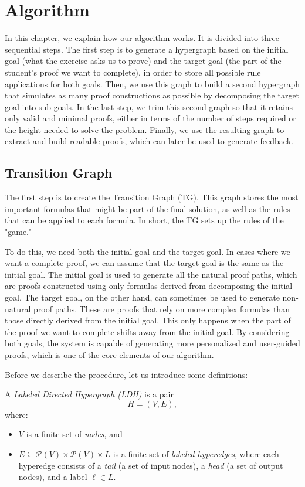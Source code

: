 \documentclass[runningheads]{llncs}
\begin{document}
\section{Algorithm}
In this chapter, we explain how our algorithm works. It is divided into three sequential steps.
The first step is to generate a hypergraph based on the initial goal (what the exercise asks us to prove) and the target goal (the part of the student's proof we want to complete), in order to store all possible rule applications for both goals. Then, we use this graph to build a second hypergraph that simulates as many proof constructions as possible by decomposing the target goal into sub-goals. In the last step, we trim this second graph so that it retains only valid and minimal proofs, either in terms of the number of steps required or the height needed to solve the problem. Finally, we use the resulting graph to extract and build readable proofs, which can later be used to generate feedback.

\subsection{Transition Graph}
The first step is to create the Transition Graph (TG). This graph stores the most important formulas that might be part of the final solution, as well as the rules that can be applied to each formula. In short, the TG sets up the rules of the "game."

To do this, we need both the initial goal and the target goal. In cases where we want a complete proof, we can assume that the target goal is the same as the initial goal. The initial goal is used to generate all the natural proof paths, which are proofs constructed using only formulas derived from decomposing the initial goal. The target goal, on the other hand, can sometimes be used to generate non-natural proof paths. These are proofs that rely on more complex formulas than those directly derived from the initial goal. This only happens when the part of the proof we want to complete shifts away from the initial goal. By considering both goals, the system is capable of generating more personalized and user-guided proofs, which is one of the core elements of our algorithm.

Before we describe the procedure, let us introduce some definitions:

\begin{definition}
A \emph{Labeled Directed Hypergraph (LDH)} is a pair
\[
H = (V, E),
\]
where:
\begin{itemize}
  \item \( V \) is a finite set of \emph{nodes}, and
  \item \( E \subseteq \mathcal{P}(V) \times \mathcal{P}(V) \times L \) is a finite set of \emph{labeled hyperedges}, where each hyperedge consists of a \emph{tail} (a set of input nodes), a \emph{head} (a set of output nodes), and a label \( \ell \in L \).
\end{itemize}
\end{definition}
\end{document}
